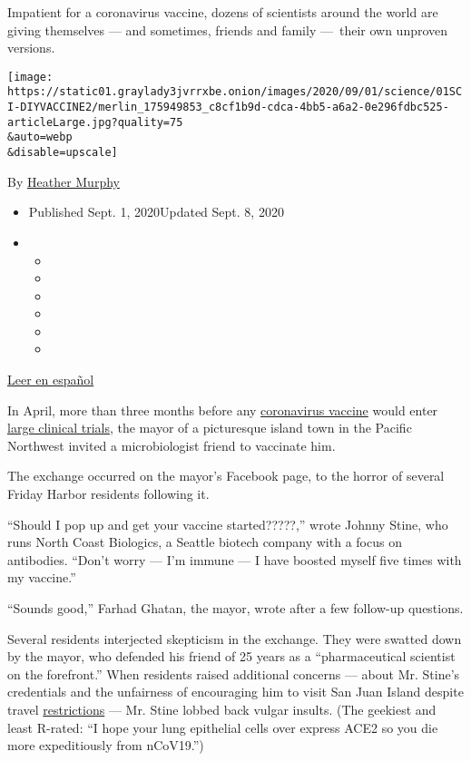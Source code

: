 Impatient for a coronavirus vaccine, dozens of scientists around the
world are giving themselves --- and sometimes, friends and family
---~their own unproven versions.

\texttt{[image: https://static01.graylady3jvrrxbe.onion/images/2020/09/01/science/01SCI-DIYVACCINE2/merlin\_175949853\_c8cf1b9d-cdca-4bb5-a6a2-0e296fdbc525-articleLarge.jpg?quality=75\\\&auto=webp\\\&disable=upscale]}

By \href{https://www.nytimes3xbfgragh.onion/by/heather-murphy}{Heather
Murphy}

\begin{itemize}
\item
  Published Sept. 1, 2020Updated Sept. 8, 2020
\item
  \begin{itemize}
  \item
  \item
  \item
  \item
  \item
  \item
  \end{itemize}
\end{itemize}

\href{https://www.nytimes3xbfgragh.onion/es/2020/09/02/espanol/ciencia-y-tecnologia/vacunas-experimentales-coronavirus.html}{Leer
en español}

In April, more than three months before any
\href{https://www.nytimes3xbfgragh.onion/2020/09/08/health/9-drug-companies-pledge-coronavirus-vaccine.html}{coronavirus
vaccine} would enter
\href{https://www.nytimes3xbfgragh.onion/2020/07/27/health/moderna-vaccine-covid.html}{large
clinical trials}, the mayor of a picturesque island town in the Pacific
Northwest invited a microbiologist friend to vaccinate him.

The exchange occurred on the mayor's Facebook page, to the horror of
several Friday Harbor residents following it.

``Should I pop up and get your vaccine started?????,'' wrote Johnny
Stine, who runs North Coast Biologics, a Seattle biotech company with a
focus on antibodies. ``Don't worry --- I'm immune --- I have boosted
myself five times with my vaccine.''

``Sounds good,'' Farhad Ghatan, the mayor, wrote after a few follow-up
questions.

Several residents interjected skepticism in the exchange. They were
swatted down by the mayor, who defended his friend of 25 years as a
``pharmaceutical scientist on the forefront.'' When residents raised
additional concerns --- about Mr. Stine's credentials and the unfairness
of encouraging him to visit San Juan Island despite travel
\href{https://mynorthwest.com/1815668/san-juan-county-council-bans-visitors/?}{restrictions}
--- Mr. Stine lobbed back vulgar insults. (The geekiest and least
R-rated: ``I hope your lung epithelial cells over express ACE2 so you
die more expeditiously from nCoV19.'')

